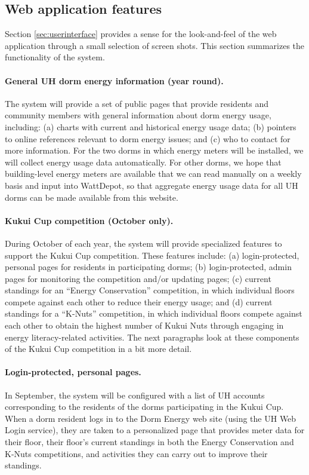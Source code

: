 \documentclass[11pt]{article}
\begin{document}
\subsection{Web application features}
\label{sec:features}

Section \ref{sec:userinterface} provides a sense for the look-and-feel of
the web application through a small selection of screen shots.  This section
summarizes the functionality of the system.

\paragraph{General UH dorm energy information (year round).}  The system
will provide a set of public pages that provide residents and community
members with general information about dorm energy usage, including: (a)
charts with current and historical energy usage data; (b) pointers to
online references relevant to dorm energy issues; and (c) who to contact
for more information.  For the two dorms in which energy meters will be
installed, we will collect energy usage data automatically.  For other
dorms, we hope that building-level energy meters are available that we can
read manually on a weekly basis and input into WattDepot, so that aggregate
energy usage data for all UH dorms can be made available from this website.

\paragraph{Kukui Cup competition (October only).}  During October of each
year, the system will provide specialized features to support the Kukui Cup
competition.  These features include: (a) login-protected, personal pages
for residents in participating dorms; (b) login-protected, admin pages for
monitoring the competition and/or updating pages; (c) current standings for
an ``Energy Conservation'' competition, in which individual floors compete
against each other to reduce their energy usage; and (d) current standings
for a ``K-Nuts'' competition, in which individual floors compete against
each other to obtain the highest number of Kukui Nuts through engaging in
energy literacy-related activities.  The next paragraphs look at these
components of the Kukui Cup competition in a bit more detail.
 
\paragraph{Login-protected, personal pages.}  In September, the system will
be configured with a list of UH accounts corresponding to the residents of
the dorms participating in the Kukui Cup.  When a dorm resident logs in to
the Dorm Energy web site (using the UH Web Login service), they are taken
to a personalized page that provides meter data for their floor, their
floor's current standings in both the Energy Conservation and K-Nuts
competitions, and activities they can carry out to improve their standings.
\end{document}
